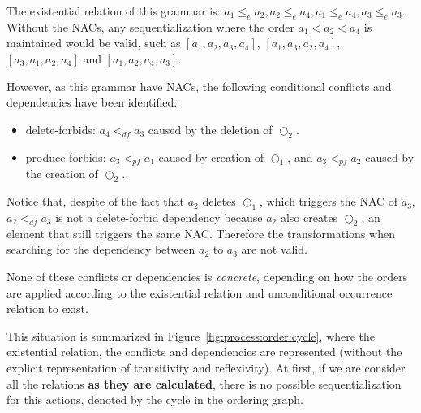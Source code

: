 \begin{example}
  The existential relation of this grammar is: $a_1 \leq_e a_2, a_2 \leq_e a_4, a_1 \leq_e a_4, a_3 \leq_e a_3$. Without the NACs, any sequentialization where the order $a_1 < a_2 < a_4$ is maintained would be valid, such as $[a_1, a_2, a_3, a_4]$, $[a_1,a_3,a_2,a_4]$, $[a_3, a_1, a_2, a_4]$ and $[a_1,a_2,a_4,a_3]$.

  However, as this grammar have NACs, the following conditional conflicts and dependencies have been identified:
\begin{itemize}
  \item delete-forbids: $a_4 <_{df} a_3$ caused by the deletion of $\Circle_2$.
  \item produce-forbids: $a_3 <_{pf} a_1$ caused by creation of $\Circle_1$, and $a_3 <_{pf} a_2$ caused by the creation of $\Circle_2$.
\end{itemize}

  Notice that, despite of the fact that $a_2$ deletes $\Circle_1$, which triggers the NAC of $a_3$, $a_2 <_{df} a_3$ is not a delete-forbid dependency because $a_2$ also creates $\Circle_2$, an element that still triggers the same NAC. Therefore the transformations when searching for the dependency between $a_2$ to $a_3$ are not valid.

  None of these conflicts or dependencies is \emph{concrete}, depending on how the orders are applied according to the existential relation and unconditional occurrence relation to exist.
  
  This situation is summarized in Figure~\ref{fig:process:order:cycle}, where the existential relation, the conflicts and dependencies are represented (without the explicit representation of transitivity and reflexivity). At first, if we are consider all the relations \textbf{as they are calculated}, there is no possible sequentialization for this actions, denoted by the cycle in the ordering graph.


\end{example}
